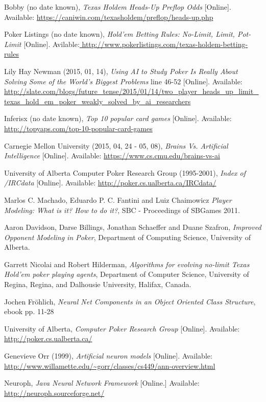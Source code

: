 \begin{thebibliography}{100} 
 Bobby (no date known), \emph{Texas Holdem Heads-Up Preflop Odds} [Online]. Available: \url{https://caniwin.com/texasholdem/preflop/heads-up.php}

 Poker Listings (no date known), \emph {Hold'em Betting Rules: No-Limit, Limit, Pot-Limit} [Online]. Avilable:\url{ http://www.pokerlistings.com/texas-holdem-betting-rules}


 Lily Hay Newman (2015, 01, 14), \emph{Using AI to Study Poker Is Really About Solving Some of the World’s Biggest Problems} line 46-52 [Online]. Available: \url{http://slate.com/blogs/future_tense/2015/01/14/two_player_heads_up_limit_texas_hold_em_poker_weakly_solved_by_ai_researchers}


 Inferisx (no date known), \emph{ Top 10 popular card games} [Online]. Available: \url{http://topyaps.com/top-10-popular-card-games}

 Carnegie Mellon University (2015, 04, 24 - 05, 08), \emph{Brains Vs. Artificial Intelligence} [Online]. Available: \url{https://www.cs.cmu.edu/brains-vs-ai}


 University of Alberta Computer Poker Research Group (1995-2001), \emph{Index of /IRCdata} [Online]. Available: \url{http://poker.cs.ualberta.ca/IRCdata/}




 Marlos C. Machado, Eduardo P. C. Fantini and Luiz Chaimowicz \emph{Player Modeling: What is it? How to do it?}, SBC - Proceedings of SBGames 2011.

 Aaron Davidson, Darse Billings, Jonathan Schaeffer and Duane Szafron, \emph{Improved Opponent Modeling in Poker},
Department of Computing Science, University of Alberta.

 Garrett Nicolai and Robert Hilderman, \emph{Algorithms for evolving no-limit Texas Hold'em poker playing agents}, Department of Computer Science, University of Regina, Regina, and Dalhousie University, Halifax, Canada.

 Jochen Fröhlich, \emph {Neural Net Components in an Object Oriented Class Structure}, 
ebook pp. 11-28





 University of Alberta, \emph{Computer Poker Research Group} [Online]. Available: \url{http://poker.cs.ualberta.ca/}

 Genevieve Orr (1999), \emph{ Artificial neuron models} [Online]. Available: \url{http://www.willamette.edu/~gorr/classes/cs449/ann-overview.html}

 Neuroph, \emph{Java Neural Network Framework} [Online.] Available: \url{http://neuroph.sourceforge.net/}


\end{thebibliography}